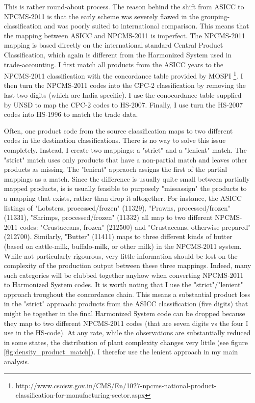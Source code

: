 \documentclass[11pt]{article}
\begin{document}
\begin{appendices}
This is rather round-about process. The reason behind the shift from ASICC to NPCMS-2011 is that the early scheme was severely flawed in the grouping-classification and was poorly suited to international comparison. This means that the mapping between ASICC and NPCMS-2011 is imperfect. The NPCMS-2011 mapping is based directly on the international standard Central Product Classification, which again is different from the Harmonized System used in trade-accounting. I first match all products from the ASICC years to the NPCMS-2011 classification with the concordance table provided by MOSPI \footnote{http://www.csoisw.gov.in/CMS/En/1027-npcms-national-product-classification-for-manufacturing-sector.aspx}. I then turn the NPCMS-2011 codes into the CPC-2 classification by removing the last two digits (which are India specific). I use the conocordance table supplied by UNSD to map the CPC-2 codes to HS-2007. Finally, I use turn the HS-2007 codes into HS-1996 to match the trade data. 

Often, one product code from the source classification maps to two different codes in the destination classifications. There is no way to solve this issue completely. Instead, I create two mappings: a "strict" and a "lenient" match. The "strict" match uses only products that have a non-partial match and leaves other products as missing. The "lenient" appraoch assigns the first of the partial mappings as a match. Since the difference is usually quite small between partially mapped products, is is usually feasible to purposely "missassign" the products to a mapping that exists, rather than drop it altogether. For instance, the ASICC listings of "Lobsters, processed/frozen" (11329), "Prawns, processed/frozen" (11331), "Shrimps, processed/frozen" (11332) all map to two different NPCMS-2011 codes: "Crustaceans, frozen" (212500) and "Crustaceans, otherwise prepared" (212700). Similarly, "Butter" (11411) maps to three different kinds of butter (based on cattle-milk, buffalo-milk, or other milk) in the NPCMS-2011 system. While not particularly rigourous, very little information should be lost on the complexity of the production output between these three mappings. Indeed, many such categories will be clubbed together anyhow when converting NPCMS-2011 to Harmonized System codes. It is worth noting that I use the "strict"/"lenient" approach troughout the concordance chain. This means a substantial product loss in the "strict" approach: products from the ASICC classification (five digits) that might be together in the final Harmonized System code can be dropped because they map to two different NPCMS-2011 codes (that are seven digits vs the four I use in the HS-code). At any rate, while the observations are substantially reduced in some states, the distribution of plant complexity changes very little (see figure \ref{fig:density_product_match}). I therefor use the lenient approach in my main analysis.


\end{appendices}
\end{document}
